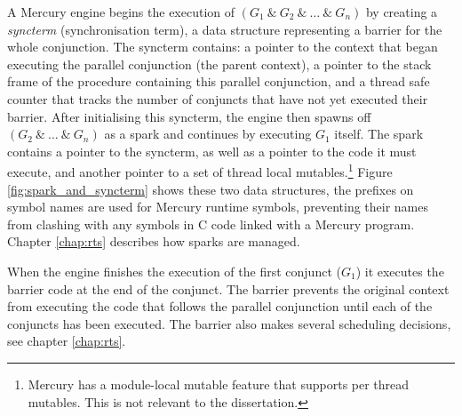 A Mercury engine begins the execution of $(G_1~\&~G_2~\&~\ldots~\&~G_n)$
by creating a \emph{syncterm} (synchronisation term), a data structure
representing a barrier for the whole conjunction.
The syncterm contains:
a pointer to the context that began executing the parallel conjunction
(the parent context),
a pointer to the stack frame of the procedure containing this parallel
conjunction,
and a thread safe counter that tracks the number of conjuncts that have not
yet executed their barrier.
After initialising this syncterm, the engine then
spawns off $(G_2~\&~\ldots~\&~G_n)$ as a spark and continues by executing
$G_1$ itself.
The spark contains a pointer to the syncterm,
as well as a pointer to the code it must execute,
and another pointer to a set of thread local mutables.\footnote{
    Mercury has a module-local mutable feature that supports
    per thread mutables.
    This is not relevant to the dissertation.}
Figure \ref{fig:spark_and_syncterm} shows these two data structures,
the  prefixes on symbol names are used for Mercury runtime
symbols,
preventing their names from clashing with any symbols in C code linked with
a Mercury program.
Chapter \ref{chap:rts} describes how sparks are managed.

When the engine finishes the execution of the first conjunct ($G_1$)
it executes the barrier code \joinandcontinue at the end of the conjunct.
The barrier prevents the original context from executing the code that
follows the parallel conjunction
until each of the conjuncts has been executed.
The barrier also makes several scheduling decisions, see chapter
\ref{chap:rts}.

